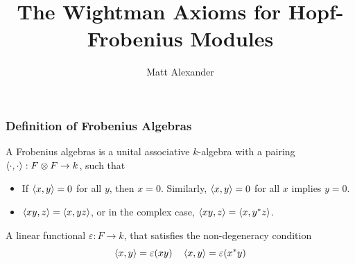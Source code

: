 \documentclass{beamer}
\title{The Wightman Axioms for Hopf-Frobenius Modules}
\author{Matt Alexander}
\begin{document}
\begin{frame}
\titlepage
\end{frame}













\begin{frame}

\frametitle{Definition of Frobenius Algebras}


A Frobenius algebras is a unital associative $k$-algebra with a pairing $\left\langle \cdot, \cdot \right\rangle: F \otimes F \to k$, such that

\begin{itemize}
\item {} If $\left\langle x,y \right\rangle = 0$ for all $y$, then $x = 0$. Similarly, $\left\langle x,y \right\rangle = 0$ for all $x$ implies $y=0$.

\item {} $\left\langle xy,z \right\rangle = \left\langle x,yz \right\rangle$, or in the complex case, $\left\langle xy,z \right\rangle = \left\langle x, y^* z \right\rangle$.
\end{itemize}


 A linear functional $\varepsilon: F \to k$, that satisfies the non-degeneracy condition
\begin{equation*}
\left\langle x,y \right\rangle = \varepsilon(xy) \quad \left\langle x,y \right\rangle = \varepsilon(x^* y)
\end{equation*}


\end{frame}





\end{document}
